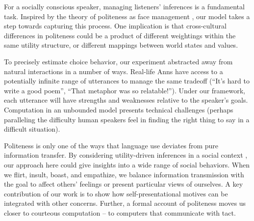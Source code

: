 \documentclass[12pt]{article}
\begin{document}


For a socially conscious speaker, managing listeners' inferences is a fundamental task. Inspired by the theory of politeness as face management \cite{brown1987}, our model takes a step towards capturing this process. One implication is that cross-cultural differences in politeness could be a product of different weightings within the same utility structure, or different mappings between world states and values.

To precisely estimate choice behavior, our experiment abstracted away from
natural interactions in a number of ways. Real-life Anns have access to a potentially infinite range of utterances to manage the same tradeoff (\enquote{It's hard to write a good poem}, \enquote{That
metaphor was so relatable!}). Under our framework, each utterance will have strengths and weaknesses relative to the speaker's goals. Computation in an unbounded model presents technical challenges \cite{goodman2016} (perhaps paralleling the difficulty human speakers feel in finding the right thing to say in a difficult situation).



Politeness is only one of the ways that language use deviates from pure information transfer. By considering utility-driven inferences in a social context \cite{baker2017rational, hamlin2013mentalistic},
our approach here could give insights into a wide range of social behaviors. When we flirt, insult, boast, and empathize, we balance information transmission with the goal to affect others' feelings or present particular views of ourselves. A key contribution of our work is to show how  self-presentational motives can be integrated with other concerns. Further, a formal account of politeness moves us closer to courteous computation -- to computers that communicate with tact.

\end{document}

